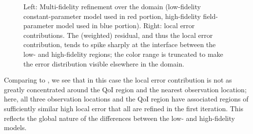 \documentclass[review,sort&compress]{elsarticle}
\begin{document}
\begin{figure}[htbp]
\caption{Left: Multi-fidelity refinement over the domain (low-fidelity constant-parameter model used in red portion, high-fidelity field-parameter model used in blue portion). Right: local error contributions. The (weighted) residual, and thus the local error contribution, tends to spike sharply at the interface between the low- and high-fidelity regions; the color range is truncated to make the error distribution visible elsewhere in the domain.}
\label{fig:svfRef}
\end{figure}
%
Comparing to , we see that in this case the local error contribution is not as greatly concentrated around the QoI region and the nearest observation location; here, all three observation locations and the QoI region have associated regions of sufficiently similar high local error that all are refined in the first iteration. This reflects the global nature of the differences between the low- and high-fidelity models. 
\end{document}
